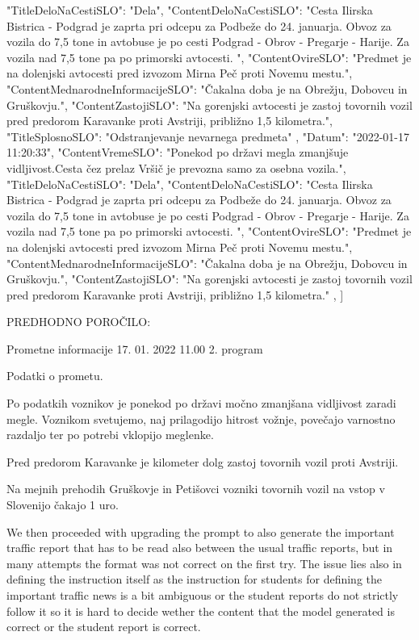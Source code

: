 \documentclass[fleqn,moreauthors,10pt]{ds_report}
\begin{document}
\begin{scriptsize}
{        "TitleDeloNaCestiSLO": "Dela",
        "ContentDeloNaCestiSLO": "Cesta Ilirska Bistrica - Podgrad je zaprta pri odcepu za Podbeže do 24. januarja. Obvoz za vozila do 7,5 tone in avtobuse je po cesti Podgrad - Obrov - Pregarje - Harije. Za vozila nad 7,5 tone pa po primorski avtocesti. ",
        "ContentOvireSLO": "Predmet je na dolenjski avtocesti pred izvozom Mirna Peč proti Novemu mestu.",
        "ContentMednarodneInformacijeSLO": "Čakalna doba je na Obrežju, Dobovcu in Gruškovju.",
        "ContentZastojiSLO": "Na gorenjski avtocesti je zastoj tovornih vozil pred predorom Karavanke proti Avstriji, približno 1,5 kilometra.",
        "TitleSplosnoSLO": "Odstranjevanje nevarnega predmeta"
    },
    {
        "Datum": "2022-01-17 11:20:33",
        "ContentVremeSLO": "Ponekod po državi megla zmanjšuje vidljivost.Cesta čez prelaz Vršič je prevozna samo za osebna vozila.",
        "TitleDeloNaCestiSLO": "Dela",
        "ContentDeloNaCestiSLO": "Cesta Ilirska Bistrica - Podgrad je zaprta pri odcepu za Podbeže do 24. januarja. Obvoz za vozila do 7,5 tone in avtobuse je po cesti Podgrad - Obrov - Pregarje - Harije. Za vozila nad 7,5 tone pa po primorski avtocesti. ",
        "ContentOvireSLO": "Predmet je na dolenjski avtocesti pred izvozom Mirna Peč proti Novemu mestu.",
        "ContentMednarodneInformacijeSLO": "Čakalna doba je na Obrežju, Dobovcu in Gruškovju.",
        "ContentZastojiSLO": "Na gorenjski avtocesti je zastoj tovornih vozil pred predorom Karavanke proti Avstriji, približno 1,5 kilometra."
    },
]

PREDHODNO POROČILO:

Prometne informacije       17. 01. 2022       11.00              2. program 

Podatki o prometu.

Po podatkih voznikov je ponekod po državi močno zmanjšana vidljivost zaradi megle. Voznikom svetujemo, naj prilagodijo hitrost vožnje, povečajo varnostno razdaljo ter po potrebi vklopijo meglenke.

Pred predorom Karavanke je kilometer dolg zastoj tovornih vozil proti Avstriji.

Na mejnih prehodih Gruškovje in Petišovci vozniki tovornih vozil na vstop v Slovenijo čakajo 1 uro. 
\end{scriptsize}

We then proceeded with upgrading the prompt to also generate the important traffic report that has to be read also between the usual traffic reports, but in many attempts the format was not correct on the first try. The issue lies also in defining the instruction itself as the instruction for students for defining the important traffic news is a bit ambiguous or the student reports do not strictly follow it so it is hard to decide wether the content that the model generated is correct or the student report is correct.
\end{document}
